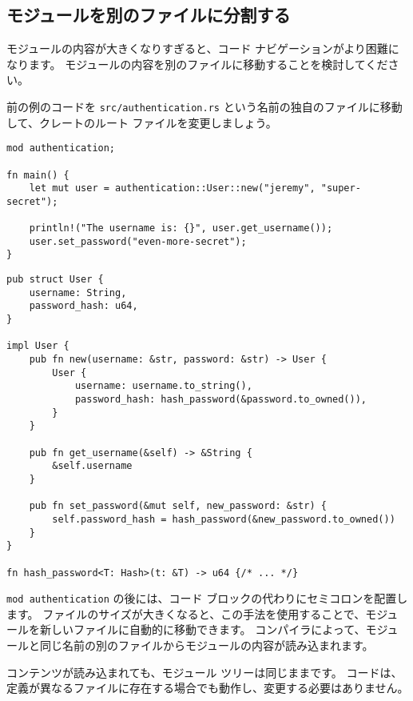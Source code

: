 \subsection{モジュールを別のファイルに分割する}

モジュールの内容が大きくなりすぎると、コード ナビゲーションがより困難になります。 モジュールの内容を別のファイルに移動することを検討してください。

前の例のコードを \texttt{src/authentication.rs} という名前の独自のファイルに移動して、クレートのルート ファイルを変更しましょう。

\begin{lstlisting}[numbers=none, caption=src/main.rs]
mod authentication;

fn main() {
    let mut user = authentication::User::new("jeremy", "super-secret");

    println!("The username is: {}", user.get_username());
    user.set_password("even-more-secret");
}
\end{lstlisting}

\begin{lstlisting}[numbers=none, caption=src/authentication.rs]
pub struct User {
    username: String,
    password_hash: u64,
}

impl User {
    pub fn new(username: &str, password: &str) -> User {
        User {
            username: username.to_string(),
            password_hash: hash_password(&password.to_owned()),
        }
    }

    pub fn get_username(&self) -> &String {
        &self.username
    }

    pub fn set_password(&mut self, new_password: &str) {
        self.password_hash = hash_password(&new_password.to_owned())
    }
}

fn hash_password<T: Hash>(t: &T) -> u64 {/* ... */}
\end{lstlisting}

\texttt{mod authentication} の後には、コード ブロックの代わりにセミコロンを配置します。 ファイルのサイズが大きくなると、この手法を使用することで、モジュールを新しいファイルに自動的に移動できます。 コンパイラによって、モジュールと同じ名前の別のファイルからモジュールの内容が読み込まれます。

コンテンツが読み込まれても、モジュール ツリーは同じままです。 コードは、定義が異なるファイルに存在する場合でも動作し、変更する必要はありません。








